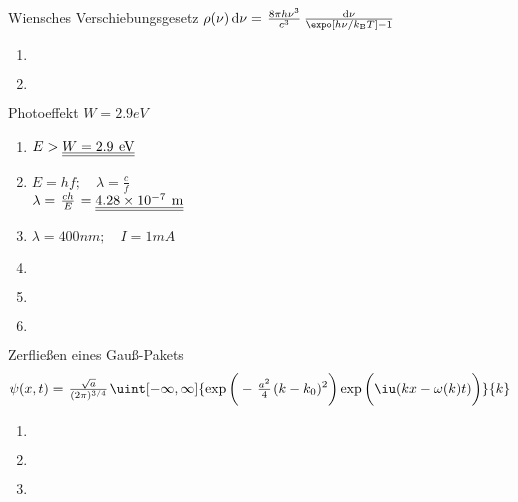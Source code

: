 \documentclass{alex_hü}
\begin{document}
\renewcommand{\labelenumi}{\alph{enumi})}


\begin{mybox}{Wiensches Verschiebungsgesetz}
	\centering \( \rho(\nu)\dd{\nu} = \tfrac{8\pi h\nu^3}{c^3}\tfrac{\dd{\nu}}{\expo[h\nu/k_{\text{B}}T] - 1} \)
	\tcblower
	\begin{enumerate}
		\item \(  \)
%			
	\tcbline
		\item \(  \)
%		
	\end{enumerate}
\end{mybox}

\begin{mybox}{Photoeffekt}
	\centering \( W = 2.9 \unit{eV} \)
	\tcblower
	\begin{enumerate}
		\item \(  E > \dl{W = 2.9 \unit{eV}}  \)
	\tcbline
		\item \( E = hf;\quad \lambda = \tfrac{c}{f} \)\\[2ex]
		\( \lambda = \tfrac{ch}{E} = \dl{4.28 \times 10^{-7} \unit{m}} \)
	\tcbline
		\item \( \lambda = 400 \unit{nm};\quad I = 1 \unit{mA} \)
	\tcbline
		\item \(  \)
	\tcbline
		\item \(  \)
	\tcbline
		\item \(  \)
	\end{enumerate}
\end{mybox}

\begin{mybox}{Zerfließen eines Gauß-Pakets}
	\vspace{-0.4cm}
	\centering \[ \psi(x, t) = \tfrac{\sqrt{a}}{(2\pi)^{3/4}} \uint[-\infty,\infty]{\exp\bigg(-\tfrac{a^2}{4}(k - k_0)^2 \bigg)\exp\bigg(\iu(kx - \omega(k)t) \bigg)}{k} \]
	\tcblower
	\begin{enumerate}
		\item \(  \)
	\tcbline
		\item \(  \)
	\tcbline
		\item \(  \)
	\end{enumerate}
\end{mybox}
\end{document}
